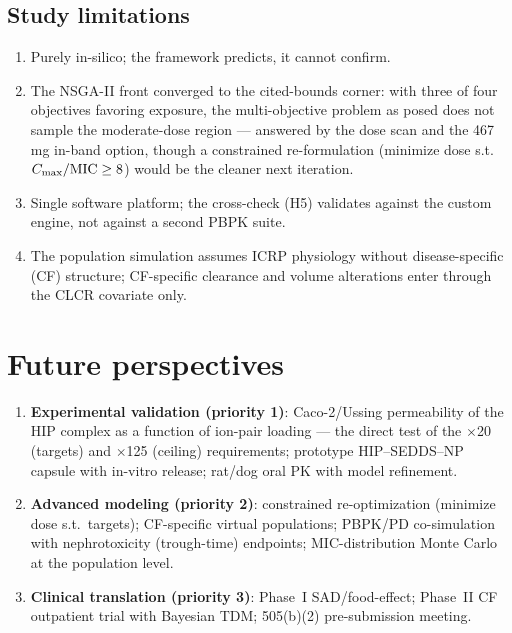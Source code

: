 \subsection{Study limitations}
\begin{enumerate}
\item Purely in-silico; the framework predicts, it cannot confirm.
\item The NSGA-II front converged to the cited-bounds corner: with three of four objectives favoring exposure, the multi-objective problem as posed does not sample the moderate-dose region --- answered by the dose scan and the 467 mg in-band option, though a constrained re-formulation (minimize dose s.t.\ $C_{\max}/\mathrm{MIC} \geq 8$) would be the cleaner next iteration.
\item Single software platform; the cross-check (H5) validates against the custom engine, not against a second PBPK suite.
\item The population simulation assumes ICRP physiology without disease-specific (CF) structure; CF-specific clearance and volume alterations enter through the CLCR covariate only.
\end{enumerate}

\section{Future perspectives}
\begin{enumerate}
\item \textbf{Experimental validation (priority 1)}: Caco-2/Ussing permeability of the HIP complex as a function of ion-pair loading --- the direct test of the $\times$20 (targets) and $\times$125 (ceiling) requirements; prototype HIP--SEDDS--NP capsule with in-vitro release; rat/dog oral PK with model refinement.
\item \textbf{Advanced modeling (priority 2)}: constrained re-optimization (minimize dose s.t.\ targets); CF-specific virtual populations; PBPK/PD co-simulation with nephrotoxicity (trough-time) endpoints; MIC-distribution Monte Carlo at the population level.
\item \textbf{Clinical translation (priority 3)}: Phase~I SAD/food-effect; Phase~II CF outpatient trial with Bayesian TDM; 505(b)(2) pre-submission meeting.
\end{enumerate}

